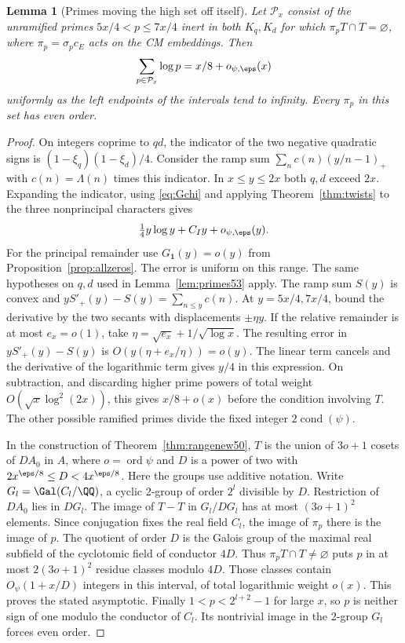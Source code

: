 \documentclass[a4paper,11pt]{article}
\newtheorem{lemma}[proposition]{Lemma}
\theoremstyle{definition}
\theoremstyle{remark}
\numberwithin{equation}{section}
\begin{document}
\begin{lemma}[Primes moving the high set off itself]\label{lem:move80}
Let \(\mathcal P_x\) consist of the unramified primes
\(5x/4<p\le 7x/4\) inert in both \(K_q,K_d\) for which
\(\pi_p T\cap T=\varnothing\), where \(\pi_p=\sigma_pc_E\)
acts on the CM embeddings. Then
\[
                  \sum_{p\in\mathcal P_x}\log p=x/8+o_{\psi,\eps}(x)
\]
uniformly as the left endpoints of the intervals tend to infinity.
Every \(\pi_p\) in this set has even order.
\end{lemma}
\begin{proof}
On integers coprime to \(qd\), the indicator of the two negative
quadratic signs is \((1-\xi_q)(1-\xi_d)/4\). Consider the ramp
sum \(\sum_n c(n)(y/n-1)_+\) with \(c(n)=\Lambda(n)\) times
this indicator. In \(x\le y\le2x\) both \(q,d\) exceed \(2x\).
Expanding the indicator, using \eqref{eq:Gchi} and applying
Theorem~\ref{thm:twists} to the three nonprincipal characters
gives
\[
                \tfrac14 y\log y+C_I y+o_{\psi,\eps}(y).
\]
For the principal remainder use \(G_{\mathbf1}(y)=o(y)\)
from Proposition~\ref{prop:allzeros}. The error is uniform on
this range. The same hypotheses on \(q,d\) used in
Lemma~\ref{lem:primes53} apply. The ramp sum \(S(y)\) is convex
and \(yS'_+(y)-S(y)=\sum_{n\le y}c(n)\). At \(y=5x/4,7x/4\),
bound the derivative by the two secants with displacements
\(\pm\eta y\). If the relative remainder is at most \(e_x=o(1)\),
take \(\eta=\sqrt{e_x}+1/\sqrt{\log x}\). The resulting error
in \(yS'_+(y)-S(y)\) is \(O(y(\eta+e_x/\eta))=o(y)\).
The linear term cancels and the derivative of the logarithmic
term gives \(y/4\) in this expression. On subtraction, and
discarding higher prime powers of total weight
\(O(\sqrt x\log^2(2x))\), this gives \(x/8+o(x)\) before
the condition involving \(T\). The other possible ramified
primes divide the fixed integer \(2\operatorname{cond}(\psi)\).

In the construction of Theorem~\ref{thm:rangenew50}, \(T\)
is the union of \(3o+1\) cosets of \(D A_0\) in \(A\), where
\(o=\operatorname{ord}\psi\) and \(D\) is a power of two
with \(2x^{\eps/8}\le D<4x^{\eps/8}\). Here the groups use
additive notation. Write \(G_l=\Gal(C_l/\QQ)\), a cyclic
2-group of order \(2^l\) divisible by \(D\). Restriction of
\(D A_0\) lies in \(D G_l\). The image of \(T-T\) in
\(G_l/DG_l\) has at most \((3o+1)^2\) elements. Since
conjugation fixes the real field \(C_l\), the image of
\(\pi_p\) there is the image of \(p\). The quotient of order
\(D\) is the Galois group of the maximal real subfield of the
cyclotomic field of conductor \(4D\). Thus \(\pi_pT\cap
T\ne\varnothing\) puts \(p\) in at most \(2(3o+1)^2\)
residue classes modulo \(4D\). Those classes contain
\(O_\psi(1+x/D)\) integers in this interval, of total
logarithmic weight \(o(x)\). This proves the stated asymptotic.
Finally \(1<p<2^{l+2}-1\) for large \(x\), so \(p\) is
neither sign of one modulo the conductor of \(C_l\).
Its nontrivial image in the 2-group \(G_l\) forces even order.
\end{proof}
\end{document}
